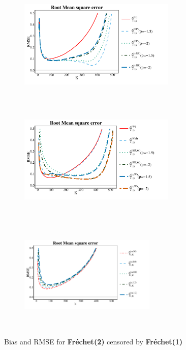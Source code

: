\begin{landscape}
\begin{figure}[h]
\begin{subfigure}[h]{0.3\linewidth}
		\includegraphics[width=7.5cm,height=5.5cm]{./plots/paper2/RMSE_simulations_F21_H.pdf}
	\end{subfigure}
	\hspace{\fill}
	\begin{subfigure}[h]{0.3\linewidth}
		\includegraphics[width=7.5cm,height=5.5cm]{./plots/paper2/RMSE_simulations_F21_W.pdf}
	\end{subfigure}
	\hspace{\fill}
	\begin{subfigure}[h]{0.3\linewidth}
		\includegraphics[width=6.5cm,height=5.5cm]{./plots/paper2/RMSE_simulations_F21_B.pdf}
	\end{subfigure}
	\caption{Bias and RMSE for \textbf{Fr\'echet(2)} censored by \textbf{Fr\'echet(1)}}
\label{paper2:fig4}
\end{figure}




\end{landscape}
